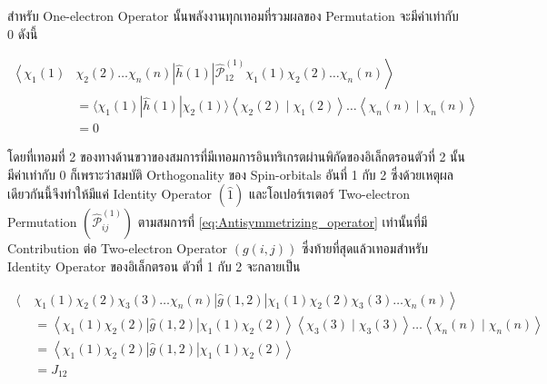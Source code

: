 \noindent สำหรับ One-electron Operator นั้นพลังงานทุกเทอมที่รวมผลของ Permutation จะมีค่าเท่ากับ 0 ดังนี้

\begin{equation}
    \begin{aligned}
        \left\langle \right. \chi_1(1) & \chi_2(2) \dots \chi_n(n)
        |\hat{h}(1)|
        \hat{\mathscr{P}}_{12}^{(1)} \chi_1(1) \chi_2(2) \dots \chi_n(n) \left. \right\rangle \\
                                       & = \langle\chi_1(1)
        |\hat{h}(1)|
        \chi_2(1)\rangle\left\langle\chi_2(2) \mid \chi_1(2)\right\rangle
        \dots\left\langle\chi_n(n) \mid \chi_n(n)\right\rangle                                \\
                                       & = 0
    \end{aligned}
\end{equation}

\noindent โดยที่เทอมที่ 2 ของทางด้านขวาของสมการที่มีเทอมการอินทริเกรตผ่านพิกัดของอิเล็กตรอนตัวที่ 2 นั้นมีค่าเท่ากับ 0 ก็เพราะว่าสมบัติ
Orthogonality ของ Spin-orbitals อันที่ 1 กับ 2 ซึ่งด้วยเหตุผลเดียวกันนี้จึงทำให้มีแค่ Identity Operator $(\hat{1})$
และโอเปอร์เรเตอร์ Two-electron Permutation $(\hat{\mathscr{P}}_{i j}^{(1)})$ ตามสมการที่ \ref{eq:Antisymmetrizing_operator}
เท่านั้นที่มี Contribution ต่อ Two-electron Operator $(g(i, j))$ ซึ่งท้ายที่สุดแล้วเทอมสำหรับ Identity Operator ของอิเล็กตรอน%
ตัวที่ 1 กับ 2 จะกลายเป็น

\begin{equation}
    \label{eq:J12_Coulomb_integral}
    \begin{aligned}
        \left\langle \right. & \chi_1(1) \chi_2(2) \chi_3(3) \dots \chi_n(n)|\hat{g}(1,2)|
        \chi_1(1) \chi_2(2) \chi_3(3) \dots \chi_n(n) \left. \right\rangle                                                           \\
                             & = \left\langle\chi_1(1) \chi_2(2)|\hat{g}(1,2)| \chi_1(1) \chi_2(2)\right\rangle\left\langle\chi_3(3)
        \mid \chi_3(3)\right\rangle \dots\left\langle\chi_n(n) \mid \chi_n(n)\right\rangle                                           \\
                             & = \left\langle\chi_1(1) \chi_2(2)|\hat{g}(1,2)| \chi_1(1) \chi_2(2)\right\rangle                      \\
                             & = J_{12}
    \end{aligned}
\end{equation}

